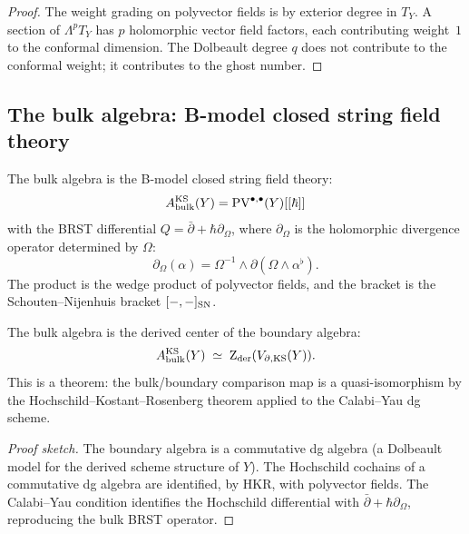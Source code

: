\begin{proof}
The weight grading on polyvector fields is by exterior degree in
$T_Y$. A section of $\Lambda^p T_Y$ has $p$ holomorphic vector
field factors, each contributing weight~$1$ to the conformal
dimension. The Dolbeault degree $q$ does not contribute to the
conformal weight; it contributes to the ghost number.
\end{proof}


\subsection{The bulk algebra: B-model closed string field theory}

\begin{definition}
The bulk algebra is the B-model closed string field theory:
\begin{equation}%
A_{\mathrm{bulk}}^{\mathrm{KS}}(Y)
= \PV^{\bullet,\bullet}(Y)[[\hbar]]
\end{equation}
with the BRST differential $Q=\bar\partial+\hbar\partial_\Omega$,
where $\partial_\Omega$ is the holomorphic divergence operator
determined by $\Omega$:
\begin{equation}%
\partial_\Omega(\alpha)
= \Omega^{-1}\wedge\partial(\Omega\wedge\alpha^\flat).
\end{equation}
The product is the wedge product of polyvector fields, and the
bracket is the Schouten--Nijenhuis bracket $[-,-]_{\mathrm{SN}}$.
\end{definition}

\begin{theorem}
The bulk algebra is the derived center of the boundary algebra:
\begin{equation}%
A_{\mathrm{bulk}}^{\mathrm{KS}}(Y)
\;\simeq\;
\Zder(V_{\partial,\mathrm{KS}}(Y)).
\end{equation}
This is a theorem: the bulk/boundary comparison map is a
quasi-isomorphism by the Hochschild--Kostant--Rosenberg theorem
applied to the Calabi--Yau dg scheme.
\end{theorem}

\begin{proof}[Proof sketch]
The boundary algebra is a commutative dg algebra (a Dolbeault
model for the derived scheme structure of $Y$). The Hochschild
cochains of a commutative dg algebra are identified, by HKR,
with polyvector fields. The Calabi--Yau condition identifies the
Hochschild differential with $\bar\partial+\hbar\partial_\Omega$,
reproducing the bulk BRST operator.
\end{proof}


